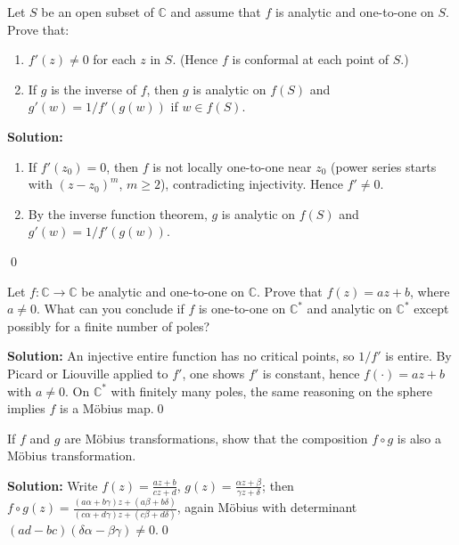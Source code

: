 \begin{problembox}
Let \( S \) be an open subset of \( \mathbb{C} \) and assume that \( f \) is analytic and one-to-one on \( S \). Prove that:
\begin{enumerate}[label=(\alph*)]
\item \( f'(z) \neq 0 \) for each \( z \) in \( S \). (Hence \( f \) is conformal at each point of \( S \).)
\item If \( g \) is the inverse of \( f \), then \( g \) is analytic on \( f(S) \) and \( g'(w) = 1 / f'(g(w)) \) if \( w \in f(S) \).
\end{enumerate}
\end{problembox}

\bigskip\noindent\textbf{Solution:}
\begin{enumerate}[label=(\alph*)]
\item If $f'(z_0)=0$, then $f$ is not locally one-to-one near $z_0$ (power series starts with $(z-z_0)^m$, $m\ge2$), contradicting injectivity. Hence $f'\ne0$.
\item By the inverse function theorem, $g$ is analytic on $f(S)$ and $g'(w)=1/f'(g(w))$.
\end{enumerate}\qed


\begin{problembox}
Let \( f : \mathbb{C} \to \mathbb{C} \) be analytic and one-to-one on \( \mathbb{C} \). Prove that \( f(z) = a z + b \), where \( a \neq 0 \). What can you conclude if \( f \) is one-to-one on \( \mathbb{C}^* \) and analytic on \( \mathbb{C}^* \) except possibly for a finite number of poles?
\end{problembox}

\bigskip\noindent\textbf{Solution:}
An injective entire function has no critical points, so $1/f'$ is entire. By Picard or Liouville applied to $f'$, one shows $f'$ is constant, hence $f(\cdot)=a z+b$ with $a\ne0$. On $\mathbb C^*$ with finitely many poles, the same reasoning on the sphere implies $f$ is a Möbius map.\qed


\begin{problembox}
If \( f \) and \( g \) are Möbius transformations, show that the composition \( f \circ g \) is also a Möbius transformation.
\end{problembox}

\bigskip\noindent\textbf{Solution:}
Write $f(z)=\frac{a z+b}{c z+d}$, $g(z)=\frac{\alpha z+\beta}{\gamma z+\delta}$; then $f\circ g(z)=\frac{(a\alpha+b\gamma)z+(a\beta+b\delta)}{(c\alpha+d\gamma)z+(c\beta+d\delta)}$, again Möbius with determinant $(ad-bc)(\delta\alpha-\beta\gamma)\ne0$.\qed



